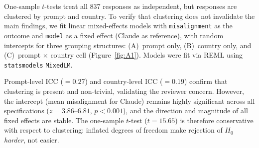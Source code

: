 \documentclass[11pt]{article}
\begin{document}
One-sample $t$-tests treat all 837 responses as independent, but responses
are clustered by prompt and country. To verify that clustering does not
invalidate the main findings, we fit linear mixed-effects models with
\texttt{misalignment} as the outcome and \texttt{model} as a fixed effect
(Claude as reference), with random intercepts for three grouping structures:
(A)~prompt only, (B)~country only, and (C)~prompt $\times$ country cell
(Figure~\ref{fig:A1}). Models were fit via REML using
\texttt{statsmodels} \texttt{MixedLM}.

Prompt-level ICC ($= 0.27$) and country-level ICC ($= 0.19$) confirm that
clustering is present and non-trivial, validating the reviewer concern.
However, the intercept (mean misalignment for Claude) remains highly
significant across all specifications ($z = 3.86$--$6.81$, $p < 0.001$),
and the direction and magnitude of all fixed effects are stable. The
one-sample $t$-test ($t=15.65$) is therefore conservative with respect to
clustering: inflated degrees of freedom make rejection of $H_0$ \emph{harder},
not easier.
\end{document}
